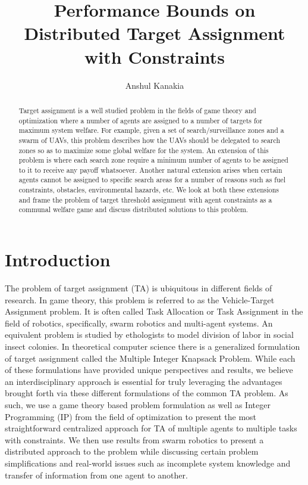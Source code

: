 \documentclass[11pt, onecolumn, compsoc, letterpaper]{article}
\title{Performance Bounds on Distributed Target Assignment with Constraints}
\author{Anshul Kanakia}
\date{}
\begin{document}
\maketitle

\begin{abstract}
Target assignment is a well studied problem in the fields of game theory and optimization where a number of agents are assigned to a number of targets for maximum system welfare. For example, given a set of search/surveillance zones and a swarm of UAVs, this problem describes how the UAVs should be delegated to search zones so as to maximize some global welfare for the system. An extension of this problem is where each search zone require a minimum number of agents to be assigned to it to receive any payoff whatsoever. Another natural extension arises when certain agents cannot be assigned to specific search areas for a number of reasons such as fuel constraints, obstacles, environmental hazards, etc. We look at both these extensions and frame the problem of target threshold assignment with agent constraints as a communal welfare game and discuss distributed solutions to this problem.
\end{abstract}

\section{Introduction}
The problem of target assignment (TA) is ubiquitous in different fields of research. In game theory, this problem is referred to as the Vehicle-Target Assignment problem. It is often called Task Allocation or Task Assignment in the field of robotics, specifically, swarm robotics and multi-agent systems. An equivalent problem is studied by ethologists to model division of labor in social insect colonies. In theoretical computer science there is a generalized formulation of target assignment called the Multiple Integer Knapsack Problem. While each of these formulations have provided unique perspectives and results, we believe an interdisciplinary approach is essential for truly leveraging the advantages brought forth via these different formulations of the common TA problem. As such, we use a game theory based problem formulation as well as Integer Programming (IP) from the field of optimization to present the most straightforward centralized approach for TA of multiple agents to multiple tasks with constraints. We then use results from swarm robotics to present a distributed approach to the problem while discussing certain problem simplifications and real-world issues such as incomplete system knowledge and transfer of information from one agent to another.
\end{document}
